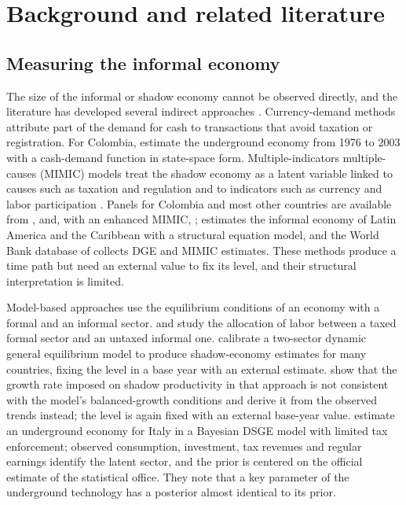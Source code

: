 \section{Background and related literature}
\label{sec:background}

\subsection{Measuring the informal economy}

The size of the informal or shadow economy cannot be observed directly, and the literature has developed several indirect approaches \citep{SchneiderEnste2000, MedinaSchneider2018}. Currency-demand methods attribute part of the demand for cash to transactions that avoid taxation or registration. For Colombia, \citet{ArangoMisasLopez2006} estimate the underground economy from 1976 to 2003 with a cash-demand function in state-space form. Multiple-indicators multiple-causes (MIMIC) models treat the shadow economy as a latent variable linked to causes such as taxation and regulation and to indicators such as currency and labor participation \citep{MedinaSchneider2018}. Panels for Colombia and most other countries are available from \citet{SchneiderBuehnMontenegro2010}, \citet{MedinaSchneider2019} and, with an enhanced MIMIC, \citet{AsllaniDellAnnoSchneider2024}; \citet{Vuletin2008} estimates the informal economy of Latin America and the Caribbean with a structural equation model, and the World Bank database of \citet{ElginKoseOhnsorgeYu2021} collects DGE and MIMIC estimates. These methods produce a time path but need an external value to fix its level, and their structural interpretation is limited.

Model-based approaches use the equilibrium conditions of an economy with a formal and an informal sector. \citet{IhrigMoe2004} and \citet{BusatoChiarini2004} study the allocation of labor between a taxed formal sector and an untaxed informal one. \citet{ElginOztunali2012} calibrate a two-sector dynamic general equilibrium model to produce shadow-economy estimates for many countries, fixing the level in a base year with an external estimate. \citet{SolisGarciaXie2017} show that the growth rate imposed on shadow productivity in that approach is not consistent with the model's balanced-growth conditions and derive it from the observed trends instead; the level is again fixed with an external base-year value. \citet{OrsiRaggiTurino2014} estimate an underground economy for Italy in a Bayesian DSGE model with limited tax enforcement; observed consumption, investment, tax revenues and regular earnings identify the latent sector, and the prior is centered on the official estimate of the statistical office. They note that a key parameter of the underground technology has a posterior almost identical to its prior.

